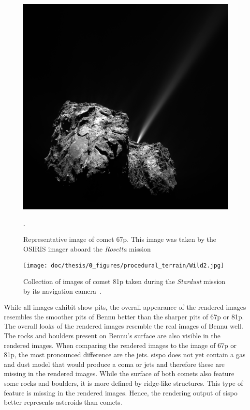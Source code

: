 \begin{figure}[htb]
    \centering
    \includegraphics[width=.8\textwidth]{doc/thesis/0_figures/procedural_terrain/67P_CG.PNG}
    \caption{Representative image of comet \acrlong{67p}. This image was taken by the OSIRIS imager aboard the \textit{Rosetta} mission~\cite{OSIRISArchiveb}}.
    \label{fig:render_quali_67p}
\end{figure}

\begin{figure}[htb]
    \centering
    \texttt{[image: doc/thesis/0\_figures/procedural\_terrain/Wild2.jpg]}
    \caption{Collection of images of comet \acrlong{81p} taken during the \textit{Stardust} mission by its navigation camera~\cite{StardustImages}.}
    \label{fig:render_quali_81p}
\end{figure}

While all images exhibit show pits, the overall appearance of the rendered images resembles the smoother pits of Bennu better than the sharper pits of \gls{67p} or \gls{81p}. The overall looks of the rendered images resemble the real images of Bennu well. The rocks and boulders present on Bennu's surface are also visible in the rendered images. When comparing the rendered images to the image of \gls{67p} or \gls{81p}, the most pronounced difference are the jets. \Gls{sispo} does not yet contain a gas and dust model that would produce a coma or jets and therefore these are missing in the rendered images. While the surface of both comets also feature some rocks and boulders, it is more defined by ridge-like structures. This type of feature is missing in the rendered images. Hence, the rendering output of \gls{sispo} better represents asteroids than comets.

